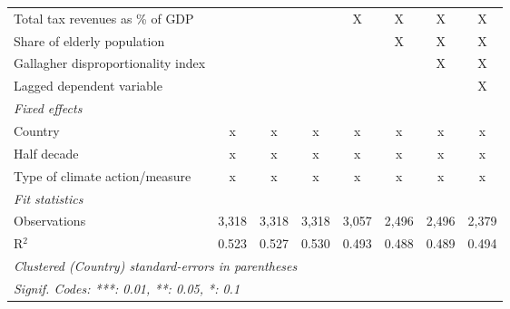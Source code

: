 \begin{table}[htbp]
\begin{tabular}{lccccccc}
      Total tax revenues as \% of GDP                                                   &              &              &               & X             & X              & X              & X\\  
      Share of elderly population                                                       &              &              &               &               & X              & X              & X\\  
      Gallagher disproportionality index                                                &              &              &               &               &                & X              & X\\  
      Lagged dependent variable                                                         &              &              &               &               &                &                & X\\  
      \emph{Fixed effects}\\
      Country                                                                           & x            & x            & x             & x             & x              & x              & x\\  
      Half decade                                                                       & x            & x            & x             & x             & x              & x              & x\\  
      Type of climate action/measure                                                    & x            & x            & x             & x             & x              & x              & x\\  
      \midrule \emph{Fit statistics}\\
      Observations                                                                      & 3,318        & 3,318        & 3,318         & 3,057         & 2,496          & 2,496          & 2,379\\  
      R$^2$                                                                             & 0.523        & 0.527        & 0.530         & 0.493         & 0.488          & 0.489          & 0.494\\  
      \midrule
      \multicolumn{8}{l}{\emph{Clustered (Country) standard-errors in parentheses}}\\
      \multicolumn{8}{l}{\emph{Signif. Codes: ***: 0.01, **: 0.05, *: 0.1}}\\
   \end{tabular}
\end{table}


